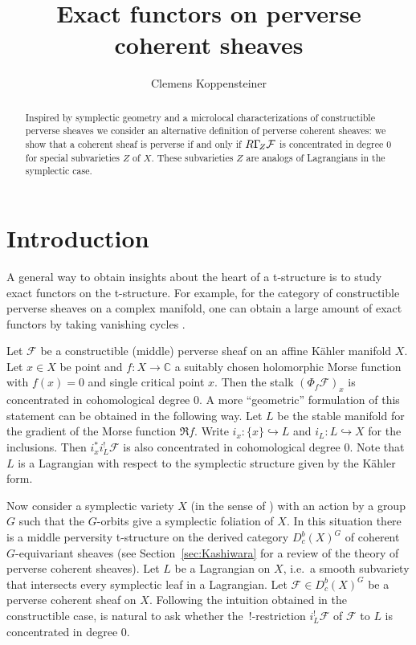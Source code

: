 \documentclass{compositio}
\title{Exact functors on perverse coherent sheaves}
\author{Clemens Koppensteiner}
\theoremstyle{plain}
\theoremstyle{definition}
\theoremstyle{remark}
\newcommand\sheaf{\mathcal}
\newcommand\lc[1]{\Gamma_{\mkern-3mu#1}}
\begin{document}
\begin{abstract}
    Inspired by symplectic geometry and a microlocal characterizations of constructible perverse sheaves we consider an alternative definition of perverse coherent sheaves:
    we show that a coherent sheaf is perverse if and only if $R\lc Z\sheaf F$ is concentrated in degree $0$ for special subvarieties $Z$ of $X$.
    These subvarieties $Z$ are analogs of Lagrangians in the symplectic case.
\end{abstract}

\maketitle

\section{Introduction}

A general way to obtain insights about the heart of a t-structure is to study exact functors on the t-structure.
For example, for the category of constructible perverse sheaves on a complex manifold, one can obtain a large amount of exact functors by taking vanishing cycles \cite[Corollary~10.3.13]{KashiwaraSchapira:1994:SheavesOnManifolds}.

Let $\sheaf F$ be a constructible (middle) perverse sheaf on an affine Kähler manifold $X$.
Let $x \in  X$ be point and $f\colon X \to  \mathbb{C}$ a suitably chosen holomorphic Morse function with $f(x) = 0$ and single critical point $x$.
Then the stalk $(\Phi _{\!f}\sheaf F)_x$ is concentrated in cohomological degree $0$.
A more \enquote{geometric} formulation of this statement can be obtained in the following way.
Let $L$ be the stable manifold for the gradient of the Morse function $\Re f$.
Write $i_x \colon \{x\} \hookrightarrow L$ and $i_L\colon L \hookrightarrow X$ for the inclusions.
Then $i_x^*i_L^! \sheaf F$ is also concentrated in cohomological degree $0$.
Note that $L$ is a Lagrangian with respect to the symplectic structure given by the Kähler form.

Now consider a symplectic variety $X$ (in the sense of \cite{Beauville:2000:SymplecticSingularities}) with an action by a group $G$ such that the $G$-orbits give a symplectic foliation of $X$.
In this situation there is a middle perversity t-structure on the derived category $D_c^b(X)^G$ of coherent $G$-equivariant sheaves (see Section~\ref{sec:Kashiwara} for a review of the theory of perverse coherent sheaves).
Let $L$ be a Lagrangian on $X$, i.e.\ a smooth subvariety that intersects every symplectic leaf in a Lagrangian.
Let $\sheaf F \in  D_c^b(X)^G$ be a perverse coherent sheaf on $X$.
Following the intuition obtained in the constructible case, is natural to ask whether the\ !-restriction $i_L^!\sheaf F$ of $\sheaf F$ to $L$ is concentrated in degree $0$.
\end{document}
